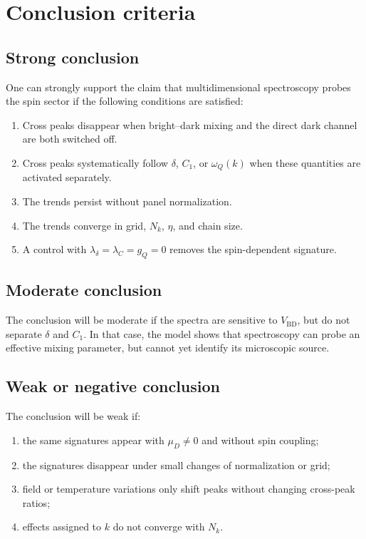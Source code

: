 \documentclass[11pt]{article}
\begin{document}
\section{Conclusion criteria}

\subsection{Strong conclusion}

One can strongly support the claim that multidimensional spectroscopy probes the spin sector if the following conditions are satisfied:
\begin{enumerate}
    \item Cross peaks disappear when bright--dark mixing and the direct dark channel are both switched off.
    \item Cross peaks systematically follow \(\delta\), \(C_1\), or \(\omega_Q(k)\) when these quantities are activated separately.
    \item The trends persist without panel normalization.
    \item The trends converge in grid, \(N_k\), \(\eta\), and chain size.
    \item A control with \(\lambda_\delta=\lambda_C=g_Q=0\) removes the spin-dependent signature.
\end{enumerate}

\subsection{Moderate conclusion}

The conclusion will be moderate if the spectra are sensitive to \(V_{\mathrm{BD}}\), but do not separate \(\delta\) and \(C_1\). In that case, the model shows that spectroscopy can probe an effective mixing parameter, but cannot yet identify its microscopic source.

\subsection{Weak or negative conclusion}

The conclusion will be weak if:
\begin{enumerate}
    \item the same signatures appear with \(\mu_D\neq0\) and without spin coupling;
    \item the signatures disappear under small changes of normalization or grid;
    \item field or temperature variations only shift peaks without changing cross-peak ratios;
    \item effects assigned to \(k\) do not converge with \(N_k\).
\end{enumerate}
\end{document}
